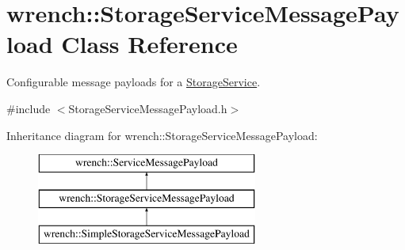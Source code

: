 \hypertarget{classwrench_1_1_storage_service_message_payload}{}\section{wrench\+:\+:Storage\+Service\+Message\+Payload Class Reference}
\label{classwrench_1_1_storage_service_message_payload}


Configurable message payloads for a \hyperlink{classwrench_1_1_storage_service}{Storage\+Service}.  




{\ttfamily \#include $<$Storage\+Service\+Message\+Payload.\+h$>$}

Inheritance diagram for wrench\+:\+:Storage\+Service\+Message\+Payload\+:\begin{figure}[H]
\begin{center}
\leavevmode
\includegraphics[height=3.000000cm]{classwrench_1_1_storage_service_message_payload}
\end{center}
\end{figure}
